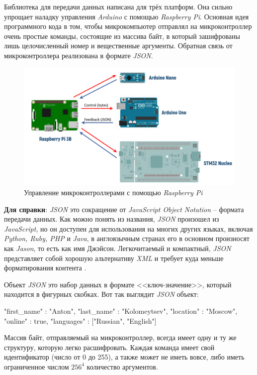 \noindent Библиотека для передачи данных написана для трёх платформ. Она сильно упрощает наладку управления \textit{Arduino} с помощью \textit{Raspberry Pi}. Основная идея программного кода в том, чтобы микрокомпьютер отправлял на микроконтроллер очень простые команды, состоящие из массива байт, в который зашифрованы лишь целочисленный номер и вещественные аргументы. Обратная связь от микроконтроллера реализована в формате \textit{JSON}.

\begin{figure}[h]
    \centering
    \includegraphics[scale=0.6]{chapter_arch/figure1.png}
    \caption{Управление микроконтроллерами с помощью \textit{Raspberry Pi}}
    \label{}
\end{figure}

\textbf{Для справки}: \textit{JSON} это сокращение от \textit{JavaScript Object Notation} -- формата передачи данных. Как можно понять из названия, \textit{JSON} произошел из \textit{JavaScript}, но он доступен для использования на многих других языках, включая \textit{Python, Ruby, PHP} и \textit{Java}, в англоязычным странах его в основном произносят как \textit{Jason}, то есть как имя Джэйсон. Легкочитаемый и компактный, \textit{JSON} представляет собой хорошую альтернативу \textit{XML} и требует куда меньше форматирования контента \cite{Jayson2018}.

\noindent Объект \textit{JSON} это набор данных в формате <<ключ-значение>>, который находится в фигурных скобках.
Вот так выглядит \textit{JSON} объект:
\begin{code}
{
  "first_name" : "Anton",
  "last_name" : "Kolomeytsev",
  "location" : "Moscow",
  "online" : true,
  "languages" : ["Russian", "English"] 
}
\end{code}

Массив байт, отправляемый на микроконтроллер, всегда имеет одну и ту же структуру, которую легко расшифровать. Каждая команда имеет свой идентификатор (число от 0 до 255), а также может не иметь вовсе, либо иметь ограниченное числом $ 256^4 $ количество аргументов. 

